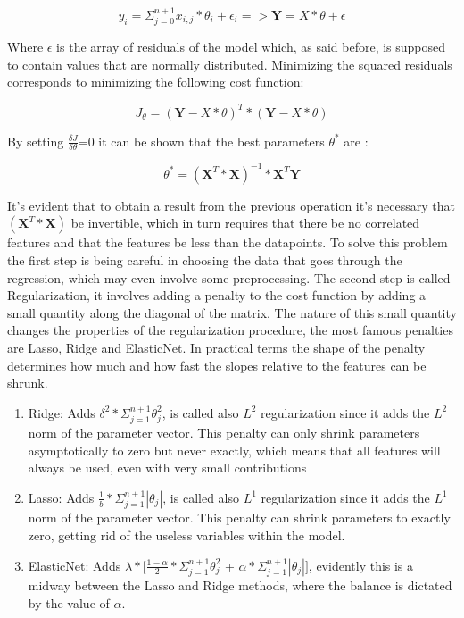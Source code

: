 \begin{equation}
y_i = \Sigma^{n+1}_{j=0} x_{i,j}*\theta_i + \epsilon_i =>  \textbf{Y} =  \textbf{$X*\theta$} + \textbf{$\epsilon$}
\end{equation}

Where $\epsilon$ is the array of residuals of the model which, as said before, is supposed to contain values that are normally distributed. Minimizing the squared residuals corresponds to minimizing the following cost function:

\begin{equation}
J_{\theta} =   (\textbf{Y} - \textbf{$X*\theta$})^T*(\textbf{Y} - \textbf{$X*\theta$})
\end{equation}

By setting $\frac{\delta J}{\delta \theta}$=0 it can be shown that the best parameters \textbf{$\theta^*$} are :

\begin{equation}
\textbf{$\theta^*$}=    (\textbf{X}^T* \textbf{X})^{-1}*\textbf{X}^T\textbf{Y}
\end{equation}

It's evident that to obtain a result from the previous operation it's necessary that $(\textbf{X}^T* \textbf{X})$ be invertible, which in turn requires that there be no correlated features and that the features be less than the datapoints. To solve this problem  the first step is being careful in choosing the data that goes through the regression, which may even involve some preprocessing. The second step is called Regularization,  it involves adding a penalty to the cost function by adding a small quantity along the diagonal of the matrix. The nature of this small quantity changes the properties of the regularization procedure, the most famous penalties are Lasso, Ridge and ElasticNet.  In practical terms the shape of the penalty determines how much and how fast the slopes relative to the features can be shrunk.

\begin{enumerate}
\item Ridge: Adds $\delta^2 * \Sigma^{n+1}_{j=1} \theta_j^2$, is called also $L^2$ regularization since it adds the $L^2$ norm of the parameter vector. This penalty can only shrink parameters asymptotically to zero but never  exactly, which means that all features will always be used,  even with very small contributions
\item Lasso: Adds $\frac{1}{b} * \Sigma^{n+1}_{j=1} |\theta_j|$, is called also $L^1$ regularization since it adds the $L^1$ norm of the parameter vector. This penalty can shrink parameters to exactly zero, getting rid of the useless variables within the model.
\item ElasticNet: Adds $\lambda*[\frac{1-\alpha}{2}  * \Sigma^{n+1}_{j=1} \theta_j^2$ + $\alpha* \Sigma^{n+1}_{j=1} |\theta_j|]$, evidently this is a midway between  the Lasso and Ridge methods, where the balance is dictated by the value of $\alpha$.
\end{enumerate}

